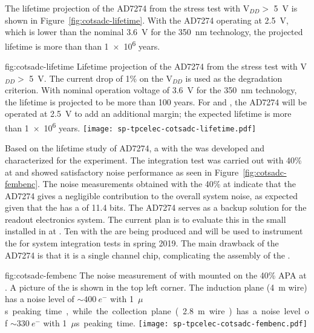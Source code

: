 The lifetime projection of the AD7274  from the stress 
test with V$_{DD} >$ \SI{5}{V} is shown in Figure~\ref{fig:cotsadc-lifetime}. 
With the AD7274 operating at \SI{2.5}{V}, which is lower than the nominal 
\SI{3.6}{V} for the \SI{350}{nm}  technology, the projected lifetime 
is more than than \num{1e6} years.

\begin{dunefigure}
{fig:cotsadc-lifetime}
{Lifetime projection of the   AD7274 from the stress test 
with V$_{DD} >$ \SI{5}{V}. The current drop of 1\% on the V$_{DD}$ is used as 
the degradation criterion. With nominal operation voltage of \SI{3.6}{V} for the 
\SI{350}{nm}  technology, the lifetime is projected to be more 
than 100 years. For  and  , the AD7274 will be
operated at \SI{2.5}{V} to add an additional margin; the expected lifetime is more 
than \num{1e6} years.}
\texttt{[image: sp-tpcelec-cotsadc-lifetime.pdf]}
\end{dunefigure}

Based on the lifetime study of AD7274, a  with the  
 was developed and characterized for the  experiment. The 
integration test was carried out with 40\%  at  and 
showed satisfactory noise performance as seen in Figure~\ref{fig:cotsadc-fembenc}.
The noise measurements obtained with the  40\%  at  indicate
that the AD7274 gives a negligible contribution to the overall system noise, as
expected given that the  has a 
of 11.4 bits. The   AD7274 serves as a backup solution for the 
   readout electronics system. The current 
plan is to evaluate this  in the small  installed in
 at . Ten  with the  
 are being produced and will be used to instrument the  
 for system integration tests in spring 2019. The main drawback of
the AD7274  is that it is a single channel chip, complicating the 
assembly of the .

\begin{dunefigure}
{fig:cotsadc-fembenc}
{The noise measurement of  with   
mounted on the \num{40}\% APA at . A picture of the 
 is shown in the top left corner. The induction plane 
(\SI{4}{m} wire) has a noise level of $\sim\SI{400}{e^-}$ with \SI{1}{$\mu$s} 
peaking time, while the collection plane (\SI{2.8}{m} wire) has a noise level
of $\sim\SI{330}{e^-}$ with \SI{1}{$\mu$s} peaking time.}
\texttt{[image: sp-tpcelec-cotsadc-fembenc.pdf]}
\end{dunefigure}

